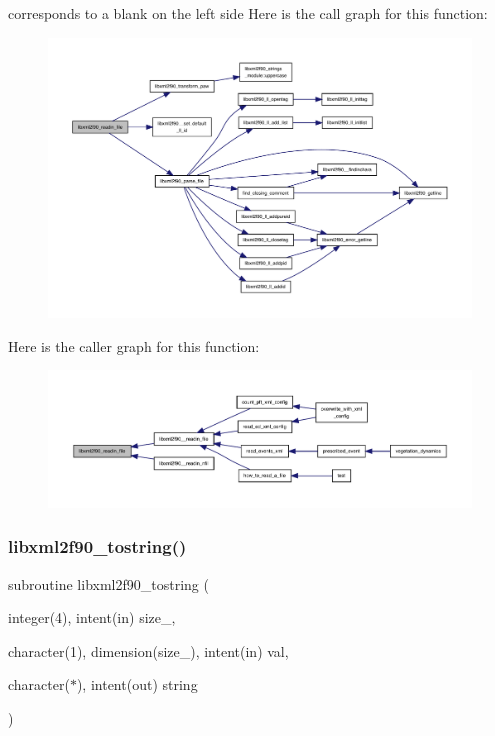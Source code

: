 corresponds to a blank on the left side Here is the call graph for this function\+:
\nopagebreak
\begin{figure}[H]
\begin{center}
\leavevmode
\includegraphics[width=350pt]{libxml2f90_8f90__pp_8f90_ae414619cb8c245cec37ab69b1acd4482_cgraph}
\end{center}
\end{figure}
Here is the caller graph for this function\+:
\nopagebreak
\begin{figure}[H]
\begin{center}
\leavevmode
\includegraphics[width=350pt]{libxml2f90_8f90__pp_8f90_ae414619cb8c245cec37ab69b1acd4482_icgraph}
\end{center}
\end{figure}
\mbox{\label{libxml2f90_8f90__pp_8f90_ad6bcb9b8b86b4f88c534b842dc1bd9a1}} 
\subsubsection{\texorpdfstring{libxml2f90\+\_\+tostring()}{libxml2f90\_tostring()}}
{\footnotesize\ttfamily subroutine libxml2f90\+\_\+tostring (\begin{DoxyParamCaption}\item[{integer(4), intent(in)}]{size\+\_\+,  }\item[{character(1), dimension(size\+\_\+), intent(in)}]{val,  }\item[{character($\ast$), intent(out)}]{string }\end{DoxyParamCaption})}

